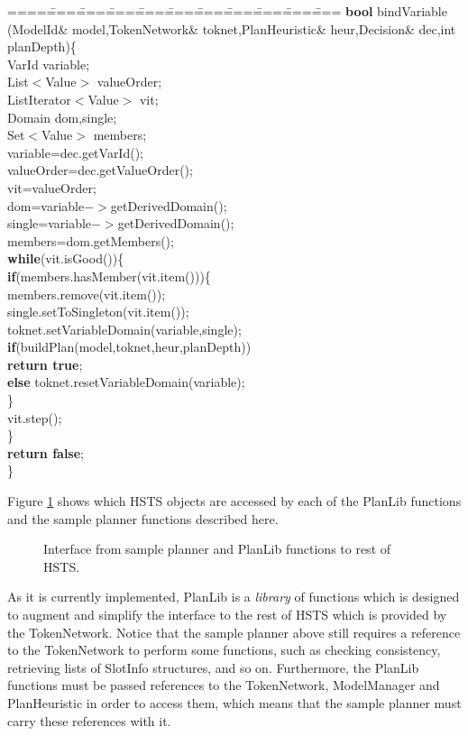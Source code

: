 \begin{tabbing}
====\====\====\====\====\====\====\====\====\====\====\kill
{\bf bool} bindVariable\\
\> \> (ModelId\& model,TokenNetwork\& toknet,PlanHeuristic\& heur,Decision\& dec,int planDepth)\{\\
\>    VarId variable;\\
\>    List$<$Value$>$ valueOrder;\\
\>    ListIterator$<$Value$>$ vit;\\
\>    Domain dom,single;\\
\>    Set$<$Value$>$ members;\\
\>    variable=dec.getVarId();\\
\>    valueOrder=dec.getValueOrder();\\
\>    vit=valueOrder;\\
\>    dom=variable$->$getDerivedDomain();\\
\>    single=variable$->$getDerivedDomain();\\
\>    members=dom.getMembers();\\
\>    {\bf while}(vit.isGood())\{\\
\>\>        {\bf if}(members.hasMember(vit.item()))\{\\
\>\>\>          members.remove(vit.item());\\
\>\>\>          single.setToSingleton(vit.item());\\
\>\>\>          toknet.setVariableDomain(variable,single);\\
\>\>\>          {\bf if}(buildPlan(model,toknet,heur,planDepth))\\
\>\>\>\>                {\bf return true};\\
\>\>\>            {\bf else} toknet.resetVariableDomain(variable);\\
\>\>        \}\\
\>\>        vit.step();\\
\>    \}\\
\>    {\bf return false};\\
\}
\end{tabbing}
\newpage

Figure \ref{interface} shows which HSTS objects are accessed by each of the 
PlanLib functions and the sample planner functions described here.

\begin{figure}[btph]
\centerline{
}
\caption{\label{interface} Interface from sample planner and PlanLib
functions to rest of HSTS.}
\end{figure}
As it is currently implemented, PlanLib is a {\em library} of functions which
is designed to augment and simplify the interface to the rest of HSTS 
which is provided by the TokenNetwork.  Notice that the sample planner above
still requires a reference to the TokenNetwork to perform some functions,
such as checking consistency, retrieving lists of SlotInfo structures, and
so on.  Furthermore, the PlanLib functions must be passed references to the
TokenNetwork, ModelManager and PlanHeuristic in order to access them, which
means that the sample planner must carry these references with it.

